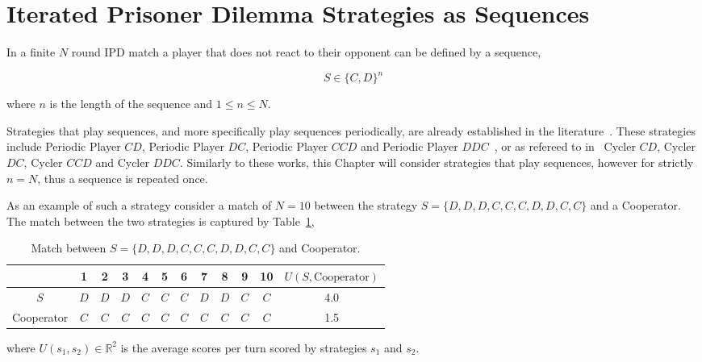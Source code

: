 \section{Iterated Prisoner Dilemma Strategies as Sequences}\label{section:ipd_as_sequences}

In a finite \(N\) round IPD match a player that does not react to their opponent
can be defined by a sequence,

\begin{equation}
    S \in \{C, D\} ^ n
\end{equation}

where \(n\) is the length of the sequence and \(1 \leq n \leq N\).

Strategies that play sequences, and more specifically play sequences periodically, are already established in the
literature~\cite{Beaufils1997}. These strategies include Periodic Player \(CD\), Periodic Player \(DC\),
Periodic Player \(CCD\) and Periodic Player \(DDC\)~\cite{Li2011, Mittal2009},
or as refereed to in~\cite{Knight2016} Cycler \(CD\), Cycler \(DC\),
Cycler \(CCD\) and Cycler \(DDC\). Similarly to these works, this Chapter will
consider strategies that play sequences, however for strictly \(n = N\), thus
a sequence is repeated once.

As an example of such a strategy consider a match of \(N = 10\) between the strategy \(S = \{D, D, D, C, C, C, D,
D, C, C\}\) and a Cooperator. The match between the two strategies is captured
by Table~\ref{table:s_vs_cooperator},

\begin{table}[htb]
\centering
\begin{tabular}{cccccccccccc}
    & \textbf{1} & \textbf{2} & \textbf{3} & \textbf{4}  & \textbf{5} & \textbf{6} & \textbf{7} & \textbf{8}  & \textbf{9} & \textbf{10} & 
    \(U(S, \text{Cooperator})\) \\ \midrule
    \(S\) & \(D\) & \(D\) & \(D\) & \(C\) & \(C\) & \(C\) & \(D\) & \(D\) & \(C\) & \(C\) & 4.0 \\
    Cooperator & \(C\) & \(C\) & \(C\) & \(C\) & \(C\) & \(C\) & \(C\) & \(C\) & \(C\) & \(C\) & 1.5 \\ \bottomrule
\end{tabular}
\caption{Match between \(S = \{D, D, D, C, C, C, D, D, C, C\}\) and Cooperator.}\label{table:s_vs_cooperator}
\end{table}

where \(U(s_1, s_2)\in \mathbb{R}^2\) is the average scores per turn scored by strategies \(s_1\) and \(s_2\).

